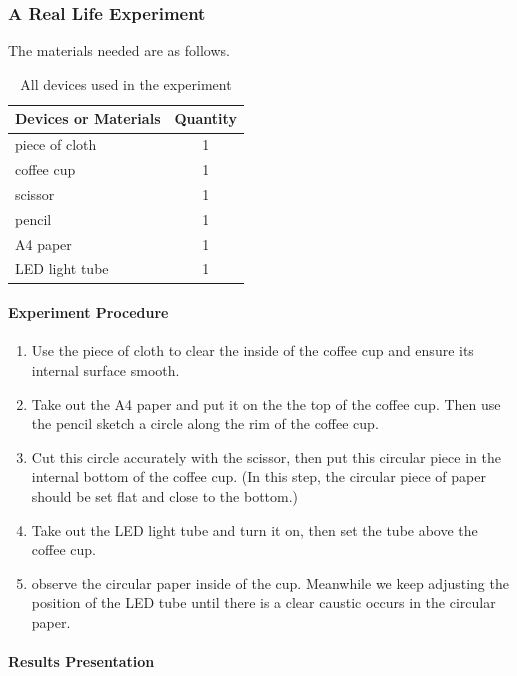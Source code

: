 \documentclass[a4paper]{article}
\begin{document}
\subsubsection{A Real Life Experiment}
The materials needed are as follows.
\begin{table}[!htbp]
    \centering
    \begin{tabular}{lc}
    \hline
    Devices or Materials&Quantity\\
    \hline
    piece of cloth&1\\
    coffee cup&1\\
    scissor&1\\
    pencil&1\\
    A4 paper&1\\
    LED light tube&1\\
    \hline
    \end{tabular}
    \caption{All devices used in the experiment}
\end{table}
    
\paragraph{Experiment Procedure}
\begin{enumerate}
        \item Use the piece of cloth to clear the inside of the coffee cup and ensure its internal surface smooth.
        
        \item Take out the A4 paper and put it on the the top of the coffee cup. Then use the pencil sketch a circle along the rim of the coffee cup.
        
        \item Cut this circle accurately with the scissor, then put this circular piece in the internal bottom of the coffee cup. (In this step, the circular piece of paper should be set flat and close to the bottom.)
        
        \item Take out the LED light tube and turn it on, then set the tube above the coffee cup.
        
        \item observe the circular paper inside of the cup. Meanwhile we keep adjusting the position of the LED tube until there is a clear caustic occurs in the circular paper.
    \end{enumerate}
    
\paragraph{Results Presentation}
    
\end{document}
